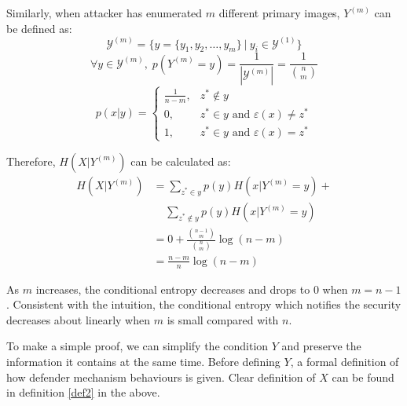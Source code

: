 \documentclass[10pt, conference, compsocconf]{IEEEtran}
\begin{document}
        Similarly, when attacker has enumerated $m$ different primary images, $Y^{(m)}$ can be defined
        as:
        \begin{equation*}
            \mathcal Y^{(m)} = \{ y = \{y_1, y_2, \ldots, y_m\} \: | \: y_i \in \mathcal Y^{(1)}\}
        \end{equation*}
        \begin{equation*}
            \forall y \in \mathcal Y^{(m)}, \; p(Y^{(m)} = y) = \frac{1}{|\mathcal Y^{(m)}|} = \frac{1}{\binom{n}{m}}
        \end{equation*}
        \begin{equation*}
            p(x|y) = \begin{cases}
                \frac{1}{n-m}, &z^* \notin y\\
                0, &z^* \in y \text{ and } \varepsilon(x) \neq z^*\\
                1, &z^* \in y \text{ and } \varepsilon(x) = z^*
            \end{cases}
        \end{equation*}

        Therefore, $H(X | Y^{(m)})$ can be calculated as:
        \begin{align*}
            H(X | Y^{(m)}) %
                &= \sum_{z^* \in y} p(y) H(x | Y^{(m)} = y) + \\
                    & \;\;\;\; \sum_{z^* \notin y} p(y) H(x | Y^{(m)} = y)\\
                &= 0+\frac{\binom{n-1}{m}}{\binom{n}{m}} \log(n-m)\\
                &= \frac{n-m}{n} \log(n-m)
        \end{align*}

        As $m$ increases,
        the conditional entropy decreases and drops to $0$ when $m = n-1$.
        Consistent with the intuition, the conditional
        entropy which notifies the security decreases about linearly when $m$ is small
        compared with $n$.

        To make a simple proof, we can simplify the
        condition $Y$ and preserve the information it contains
        at the same time. Before defining $Y$, a
        formal definition of how defender mechanism behaviours is given. Clear
        definition of $X$ can be found in definition \ref{def2} in the above.
\end{document}
